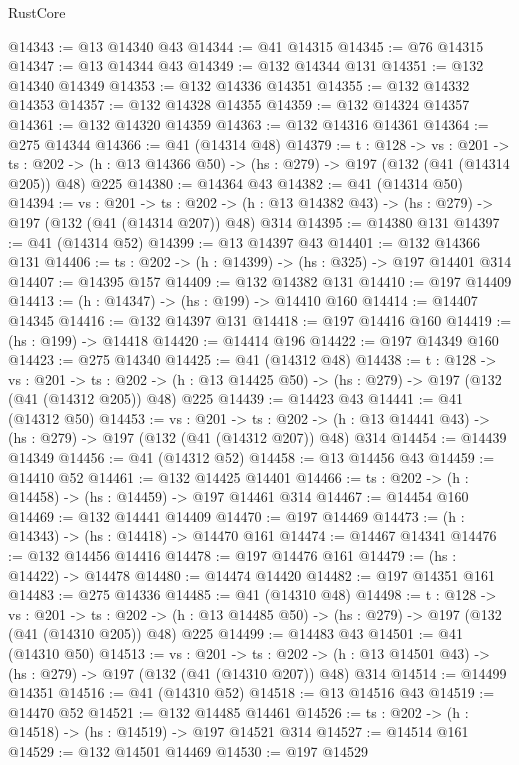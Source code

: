 \begin{lexlean}{RustCore}
\begin{coremodule}
@14343 := @13 @14340 @43
@14344 := @41 @14315
@14345 := @76 @14315
@14347 := @13 @14344 @43
@14349 := @132 @14344 @131
@14351 := @132 @14340 @14349
@14353 := @132 @14336 @14351
@14355 := @132 @14332 @14353
@14357 := @132 @14328 @14355
@14359 := @132 @14324 @14357
@14361 := @132 @14320 @14359
@14363 := @132 @14316 @14361
@14364 := @275 @14344
@14366 := @41 (@14314 @48)
@14379 := {t : @128} ->
  {vs : @201} ->
  {ts : @202} -> (h : @13 @14366 @50) -> (hs : @279) -> @197 (@132 (@41 (@14314 @205)) @48) @225
@14380 := @14364 @43
@14382 := @41 (@14314 @50)
@14394 := {vs : @201} ->
  {ts : @202} -> (h : @13 @14382 @43) -> (hs : @279) -> @197 (@132 (@41 (@14314 @207)) @48) @314
@14395 := @14380 @131
@14397 := @41 (@14314 @52)
@14399 := @13 @14397 @43
@14401 := @132 @14366 @131
@14406 := {ts : @202} -> (h : @14399) -> (hs : @325) -> @197 @14401 @314
@14407 := @14395 @157
@14409 := @132 @14382 @131
@14410 := @197 @14409
@14413 := (h : @14347) -> (hs : @199) -> @14410 @160
@14414 := @14407 @14345
@14416 := @132 @14397 @131
@14418 := @197 @14416 @160
@14419 := (hs : @199) -> @14418
@14420 := @14414 @196
@14422 := @197 @14349 @160
@14423 := @275 @14340
@14425 := @41 (@14312 @48)
@14438 := {t : @128} ->
  {vs : @201} ->
  {ts : @202} -> (h : @13 @14425 @50) -> (hs : @279) -> @197 (@132 (@41 (@14312 @205)) @48) @225
@14439 := @14423 @43
@14441 := @41 (@14312 @50)
@14453 := {vs : @201} ->
  {ts : @202} -> (h : @13 @14441 @43) -> (hs : @279) -> @197 (@132 (@41 (@14312 @207)) @48) @314
@14454 := @14439 @14349
@14456 := @41 (@14312 @52)
@14458 := @13 @14456 @43
@14459 := @14410 @52
@14461 := @132 @14425 @14401
@14466 := {ts : @202} -> (h : @14458) -> (hs : @14459) -> @197 @14461 @314
@14467 := @14454 @160
@14469 := @132 @14441 @14409
@14470 := @197 @14469
@14473 := (h : @14343) -> (hs : @14418) -> @14470 @161
@14474 := @14467 @14341
@14476 := @132 @14456 @14416
@14478 := @197 @14476 @161
@14479 := (hs : @14422) -> @14478
@14480 := @14474 @14420
@14482 := @197 @14351 @161
@14483 := @275 @14336
@14485 := @41 (@14310 @48)
@14498 := {t : @128} ->
  {vs : @201} ->
  {ts : @202} -> (h : @13 @14485 @50) -> (hs : @279) -> @197 (@132 (@41 (@14310 @205)) @48) @225
@14499 := @14483 @43
@14501 := @41 (@14310 @50)
@14513 := {vs : @201} ->
  {ts : @202} -> (h : @13 @14501 @43) -> (hs : @279) -> @197 (@132 (@41 (@14310 @207)) @48) @314
@14514 := @14499 @14351
@14516 := @41 (@14310 @52)
@14518 := @13 @14516 @43
@14519 := @14470 @52
@14521 := @132 @14485 @14461
@14526 := {ts : @202} -> (h : @14518) -> (hs : @14519) -> @197 @14521 @314
@14527 := @14514 @161
@14529 := @132 @14501 @14469
@14530 := @197 @14529

\end{coremodule}
\end{lexlean}
